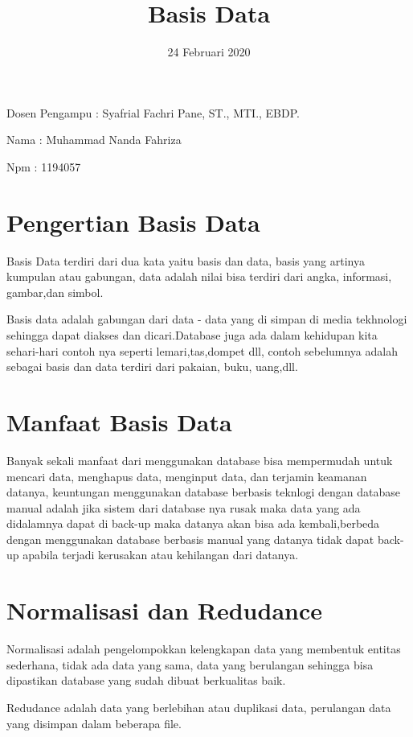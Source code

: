 \documentclass{article}
\title{Basis Data}
\author{}
\date{24 Februari 2020}
\begin{document}
\maketitle
Dosen Pengampu : Syafrial Fachri Pane, ST., MTI., EBDP.
\newline

Nama : Muhammad Nanda Fahriza
\newline

Npm : 1194057
\section{Pengertian Basis Data}


Basis Data terdiri dari dua kata yaitu basis dan data, basis yang artinya kumpulan atau gabungan, data adalah nilai bisa terdiri dari angka, informasi, gambar,dan simbol.



Basis data adalah gabungan dari data - data yang di simpan di media tekhnologi sehingga dapat diakses dan dicari.Database juga ada dalam kehidupan kita sehari-hari contoh nya seperti lemari,tas,dompet dll, contoh sebelumnya adalah sebagai basis dan data terdiri dari pakaian, buku, uang,dll.

\section{Manfaat Basis Data}
Banyak sekali manfaat dari menggunakan database bisa mempermudah untuk mencari data, menghapus data, menginput data, dan terjamin keamanan datanya, keuntungan menggunakan database berbasis teknlogi dengan database manual adalah jika sistem dari database nya rusak maka data yang ada didalamnya dapat di back-up maka datanya akan bisa ada kembali,berbeda dengan menggunakan database berbasis manual yang datanya tidak dapat back-up apabila terjadi kerusakan atau kehilangan dari datanya.



\section{Normalisasi dan Redudance}
Normalisasi adalah pengelompokkan kelengkapan data yang membentuk entitas sederhana, tidak ada data yang sama, data yang berulangan sehingga bisa dipastikan database yang sudah dibuat berkualitas baik.



Redudance adalah data yang berlebihan atau duplikasi data, perulangan data yang disimpan dalam beberapa file.
\end{document}

